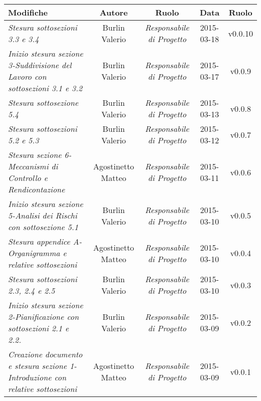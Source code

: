 \newpage

\begin{table}[h]
\centering
\begin{tabular}{|p{}|c|c|c|c|}
	\toprule
		\textbf{Modifiche} & \textbf{Autore} & \textbf{Ruolo} & \textbf{Data} & \textbf{Ruolo} \\
	\midrule
	\midrule
		\textit{Stesura sottosezioni 3.3 e 3.4} & Burlin Valerio & \textit{Responsabile di Progetto} & 2015-03-18 & v0.0.10 \\
	\midrule
		\textit{Inizio stesura sezione 3-Suddivisione del Lavoro con sottosezioni 3.1 e 3.2} & Burlin Valerio & \textit{Responsabile di Progetto} & 2015-03-17 & v0.0.9 \\
	\midrule
		\textit{Stesura sottosezione 5.4} & Burlin Valerio & \textit{Responsabile di Progetto} & 2015-03-13 & v0.0.8 \\
	\midrule
		\textit{Stesura sottosezioni 5.2 e 5.3} & Burlin Valerio & \textit{Responsabile di Progetto} & 2015-03-12 & v0.0.7 \\
	\midrule
		\textit{Stesura sezione 6-Meccanismi di Controllo e Rendicontazione} & Agostinetto Matteo & \textit{Responsabile di Progetto} & 2015-03-11 & v0.0.6 \\
	\midrule
		\textit{Inizio stesura sezione 5-Analisi dei Rischi con sottosezione 5.1} & Burlin Valerio & \textit{Responsabile di Progetto} & 2015-03-10 & v0.0.5 \\
	\midrule
		\textit{Stesura appendice A-Organigramma e relative sottosezioni} & Agostinetto Matteo & \textit{Responsabile di Progetto} & 2015-03-10 & v0.0.4 \\
	\midrule
		\textit{Stesura sottosezioni 2.3, 2.4 e 2.5} & Burlin Valerio & \textit{Responsabile di Progetto} & 2015-03-10 & v0.0.3 \\
	\midrule
		\textit{Inizio stesura sezione 2-Pianificazione con sottosezioni 2.1 e 2.2.} & Burlin Valerio & \textit{Responsabile di Progetto} & 2015-03-09 & v0.0.2 \\	                         
	\midrule
		\textit{Creazione documento e stesura sezione 1-Introduzione con relative sottosezioni} & Agostinetto Matteo & \textit{Responsabile di Progetto} & 2015-03-09 & v0.0.1 \\
	\bottomrule
\end{tabular}	
\end{table}

\newpage